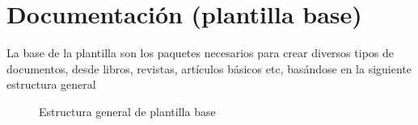 {\justifying
\chapter{Documentación (plantilla base)}\label{cap:designEditorial}
	La base de la plantilla son los paquetes necesarios para crear diversos tipos de documentos, desde libros, revistas, artículos básicos etc, basándose en la siguiente estructura general
	\begin{figure}[H]
		\centering
		
		\caption{Estructura general de plantilla base}
		\label{fig:estructuraPlantillaBaseGeneral}
	\end{figure}
}
